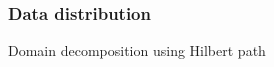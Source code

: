 \documentclass[mathserif]{beamer}
\begin{document}
\begin{frame}
    \frametitle{Data distribution}
    Domain decomposition using Hilbert path

\end{frame}
\end{document}
